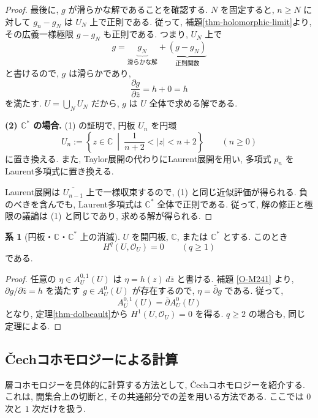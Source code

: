 \documentclass[dvipdfmx,a4paper,11pt]{article} %
\newcommand{\C}{\mathbb{C}}
\theoremstyle{definition}
\numberwithin{equation}{section}
\newtheorem{cor}[thm]{系}
\begin{document}
\begin{proof}
最後に, $g$ が滑らかな解であることを確認する.
$N$ を固定すると, $n\geq N$ に対して
$g_n-g_N$ は $U_N$ 上で正則である.
従って, 補題\ref{thm-holomorphic-limit}より,
その広義一様極限 $g-g_N$ も正則である.
つまり, $U_N$ 上で
\[
g=
\underbrace{g_N}_{\text{滑らかな解}}
+
\underbrace{(g-g_N)}_{\text{正則関数}}
\]
と書けるので, $g$ は滑らかであり,
\[
\frac{\partial g}{\partial\bar z}=h+0=h
\]
を満たす.
$U=\bigcup_N U_N$ だから, $g$ は $U$ 全体で求める解である.

\medskip
\noindent
\textbf{(2) $\C^*$ の場合.}
(1) の証明で, 円板 $U_n$ を円環
\[
U_n:=\left\{z\in\C\ \middle|\
\frac1{n+2}<|z|<n+2\right\}
\qquad(n\geq0)
\]
に置き換える.
また, Taylor展開の代わりにLaurent展開を用い,
多項式 $p_n$ をLaurent多項式に置き換える.

Laurent展開は $\overline{U_{n-1}}$ 上で一様収束するので,
(1) と同じ近似評価が得られる.
負のべきを含んでも, Laurent多項式は $\C^*$ 全体で正則である.
従って, 解の修正と極限の議論は (1) と同じであり,
求める解が得られる.
\end{proof}

\begin{cor}[円板・$\C$・$\C^*$ 上の消滅]\label{O-M240}
$U$ を開円板, $\C$, または $\C^*$ とする.
このとき
\[
H^q(U,\mathcal O_U)=0\qquad(q\geq1)
\]
である.
\end{cor}

\begin{proof}
任意の $\eta\in A_U^{0,1}(U)$ は
$\eta=h(z)\,d\overline z$ と書ける.
補題 \ref{O-M241} より, 
$\partial g/\partial\overline z=h$ を満たす
$g\in A_U^0(U)$ が存在するので, $\eta=\bar\partial g$ である.
従って, 
\[
A_U^{0,1}(U)=\bar\partial A_U^0(U)
\]
となり, 定理\ref{thm-dolbeault}から $H^1(U,\mathcal O_U)=0$ を得る.
$q\geq2$ の場合も, 同じ定理による.
\end{proof}



\subsection{\v{C}echコホモロジーによる計算}\label{O-S038}

層コホモロジーを具体的に計算する方法として, 
\v{C}echコホモロジーを紹介する.
これは, 開集合上の切断と, その共通部分での差を用いる方法である.
ここでは $0$ 次と $1$ 次だけを扱う.
\end{document}
